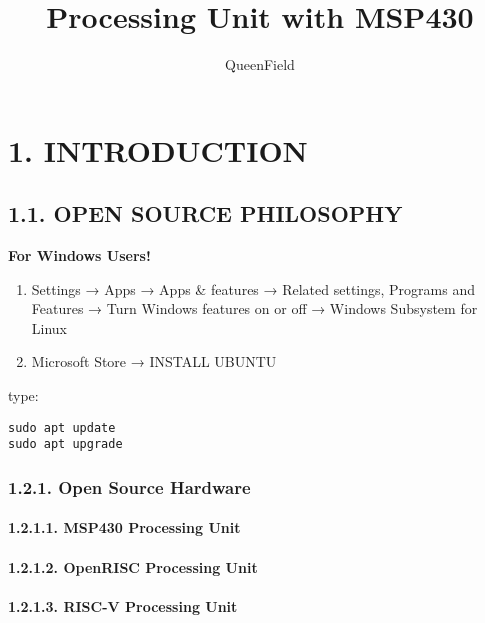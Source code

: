 \documentclass[]{article}
\title{Processing Unit with MSP430}
\author{QueenField}
\date{}
\let\oldparagraph\paragraph
\renewcommand{\paragraph}[1]{\oldparagraph{#1}\mbox{}}
\begin{document}
\maketitle

\hypertarget{introduction}{%
\section{1. INTRODUCTION}\label{introduction}}

\hypertarget{open-source-philosophy}{%
\subsection{1.1. OPEN SOURCE PHILOSOPHY}\label{open-source-philosophy}}

\textbf{For Windows Users!}

\begin{enumerate}
\def\labelenumi{\arabic{enumi}.}
\item
  Settings → Apps → Apps \& features → Related settings, Programs and
  Features → Turn Windows features on or off → Windows Subsystem for
  Linux
\item
  Microsoft Store → INSTALL UBUNTU
\end{enumerate}

type:

\begin{verbatim}
sudo apt update
sudo apt upgrade
\end{verbatim}

\hypertarget{open-source-hardware}{%
\subsubsection{1.2.1. Open Source Hardware}\label{open-source-hardware}}

\hypertarget{msp430-processing-unit}{%
\paragraph{1.2.1.1. MSP430 Processing
Unit}\label{msp430-processing-unit}}

\hypertarget{openrisc-processing-unit}{%
\paragraph{1.2.1.2. OpenRISC Processing
Unit}\label{openrisc-processing-unit}}

\hypertarget{risc-v-processing-unit}{%
\paragraph{1.2.1.3. RISC-V Processing
Unit}\label{risc-v-processing-unit}}
\end{document}
